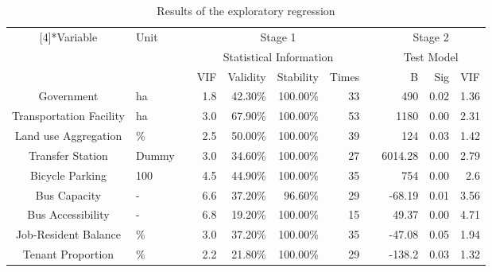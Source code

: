 \begin{sidewaystable}[htbp]
	\centering
	\caption{Results of the exploratory regression}
	\label{tab:chp2:ExploratoryRegression}%
	\small
	\renewcommand{\arraystretch}{1.25} %
	\begin{tabular}{clrrrrrcrrr}
		\Xhline{1.5pt}
		
		\multirow{3}[4]{*}{Variable} & \multirow{3}[4]{*}{Unit} & & \multicolumn{4}{c}{Stage 1} & & \multicolumn{3}{c}{Stage 2} \\
		
		& & & \multicolumn{4}{c}{Statistical Information} & & \multicolumn{3}{c}{Test Model} \\
		
		\cmidrule{4-7} \cmidrule{9-11}
		
		& & & VIF & Validity & Stability & Times & & B & Sig & VIF \\
		
		\cmidrule{1-2}\cmidrule{4-7}\cmidrule{9-11}
		
		Government & ha & & 1.8 & 42.30\% & 100.00\% & 33 & & 490 & 0.02  & 1.36 \\
		Transportation Facility & ha & & 3.0 & 67.90\% & 100.00\% & 53 & & 1180 & 0.00 & 2.31 \\
		
		Land use Aggregation & \% & & 2.5 & 50.00\% & 100.00\% & 39 & & 124 & 0.03 & 1.42 \\
		
		Transfer Station & Dummy & & 3.0 & 34.60\% & 100.00\% & 27 & & 6014.28 & 0.00 & 2.79 \\
		
		Bicycle Parking & 100 & & 4.5 & 44.90\% & 100.00\% & 35 & & 754 & 0.00 & 2.6 \\
		
		Bus Capacity & - & & 6.6 & 37.20\% & 96.60\% & 29 & & -68.19 & 0.01 & 3.56 \\
		
		Bus Accessibility & - & & 6.8 & 19.20\% & 100.00\% & 15 & & 49.37 & 0.00 & 4.71 \\
		
		Job-Resident Balance & \% & & 3.0 & 37.20\% & 100.00\% & 35 & & -47.08 & 0.05  & 1.94 \\
		
		Tenant Proportion & \% & & 2.2 & 21.80\% & 100.00\% & 29 & & -138.2 & 0.03  & 1.32 \\
		

\end{tabular}
\end{sidewaystable}
